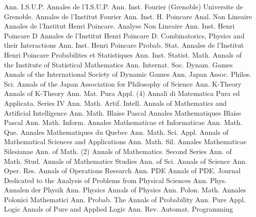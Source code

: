 {Ann. I.S.U.P.}
{Annales de l'I.S.U.P.}
{Ann. Inst. Fourier (Grenoble)}
{Universite de Grenoble. Annales de l'Institut Fourier}
{Ann. Inst. H. Poincare Anal. Non Lineaire}
{Annales de l'Institut Henri Poincare. Analyse Non Lineaire}
{Ann. Inst. Henri Poincare D}
{Annales de l'Institut Henri Poincare D. Combinatorics, Physics and their Interactions}
{Ann. Inst. Henri Poincare Probab. Stat.}
{Annales de l'Institut Henri Poincare Probabilites et Statistiques}
{Ann. Inst. Statist. Math.}
{Annals of the Institute of Statistical Mathematics}
{Ann. Internat. Soc. Dynam. Games}
{Annals of the International Society of Dynamic Games}
{Ann. Japan Assoc. Philos. Sci.}
{Annals of the Japan Association for Philosophy of Science}
{Ann. K-Theory}
{Annals of K-Theory}
{Ann. Mat. Pura Appl. (4)}
{Annali di Matematica Pura ed Applicata. Series IV}
{Ann. Math. Artif. Intell.}
{Annals of Mathematics and Artificial Intelligence}
{Ann. Math. Blaise Pascal}
{Annales Mathematiques Blaise Pascal}
{Ann. Math. Inform.}
{Annales Mathematicae et Informaticae}
{Ann. Math. Que.}
{Annales Mathematiques du Quebec}
{Ann. Math. Sci. Appl.}
{Annals of Mathematical Sciences and Applications}
{Ann. Math. Sil.}
{Annales Mathematicae Silesianae}
{Ann. of Math. (2)}
{Annals of Mathematics. Second Series}
{Ann. of Math. Stud.}
{Annals of Mathematics Studies}
{Ann. of Sci.}
{Annals of Science}
{Ann. Oper. Res.}
{Annals of Operations Research}
{Ann. PDE}
{Annals of PDE. Journal Dedicated to the Analysis of Problems from Physical Sciences}
{Ann. Phys.}
{Annalen der Physik}
{Ann. Physics}
{Annals of Physics}
{Ann. Polon. Math.}
{Annales Polonici Mathematici}
{Ann. Probab.}
{The Annals of Probability}
{Ann. Pure Appl. Logic}
{Annals of Pure and Applied Logic}
{Ann. Rev. Automat. Programming}
